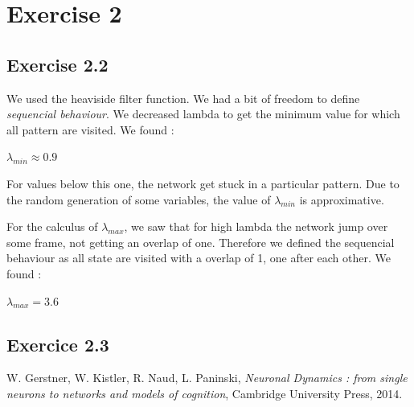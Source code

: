 \section{Exercise 2}
\subsection{Exercise 2.2}
We used the heaviside filter function. We had a bit
of freedom to define {\it sequencial behaviour}. We decreased lambda to get the minimum value
for which all pattern are visited. We found :
\begin{center}
$\lambda_{min} \approx 0.9$
\end{center}
For values below this one, the network get stuck in a particular pattern. Due to the random generation
of some variables, the value of $\lambda_{min}$ is approximative.


For the calculus of $\lambda_{max}$, we saw that for high lambda the network jump over some frame, not
getting an overlap of one. Therefore we defined the sequencial behaviour as all state are visited with a overlap of 1, 
one after each other.
We found :
\begin{center}
$\lambda_{max} = 3.6$
\end{center}
\subsection{Exercice 2.3}

\begin{thebibliography}{}
 W. Gerstner, W. Kistler, R. Naud, L. Paninski, \textit{Neuronal Dynamics : from single neurons to networks and models of cognition}, Cambridge University Press, 2014.
\end{thebibliography}
